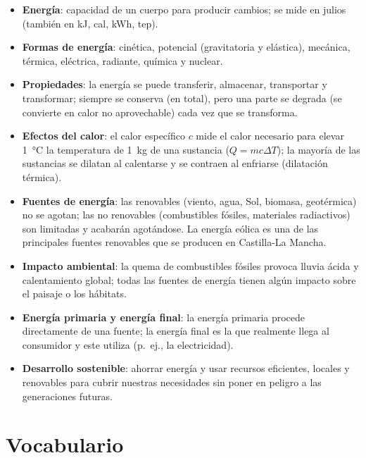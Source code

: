 \begin{itemize}
    \item \textbf{Energía}: capacidad de un cuerpo para producir cambios; se mide en julios (también en kJ, cal, kWh, tep).
    \item \textbf{Formas de energía}: cinética, potencial (gravitatoria y elástica), mecánica, térmica, eléctrica, radiante, química y nuclear.
    \item \textbf{Propiedades}: la energía se puede transferir, almacenar, transportar y transformar; siempre se conserva (en total), pero una parte se degrada (se convierte en calor no aprovechable) cada vez que se transforma.
    \item \textbf{Efectos del calor}: el calor específico \(c\) mide el calor necesario para elevar \qty{1}{\celsius} la temperatura de \qty{1}{\kg} de una sustancia (\(Q = mc\Delta T\)); la mayoría de las sustancias se dilatan al calentarse y se contraen al enfriarse (dilatación térmica).
    \item \textbf{Fuentes de energía}: las renovables (viento, agua, Sol, biomasa, geotérmica) no se agotan; las no renovables (combustibles fósiles, materiales radiactivos) son limitadas y acabarán agotándose. La energía eólica es una de las principales fuentes renovables que se producen en Castilla-La Mancha.
    \item \textbf{Impacto ambiental}: la quema de combustibles fósiles provoca lluvia ácida y calentamiento global; todas las fuentes de energía tienen algún impacto sobre el paisaje o los hábitats.
    \item \textbf{Energía primaria y energía final}: la energía primaria procede directamente de una fuente; la energía final es la que realmente llega al consumidor y este utiliza (p.\ ej., la electricidad).
    \item \textbf{Desarrollo sostenible}: ahorrar energía y usar recursos eficientes, locales y renovables para cubrir nuestras necesidades sin poner en peligro a las generaciones futuras.
\end{itemize}

\section{Vocabulario}

